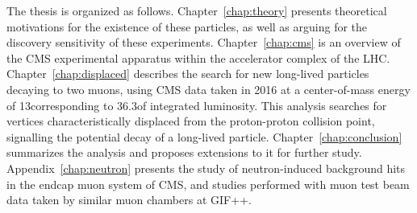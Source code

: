 The thesis is organized as follows.
Chapter~\ref{chap:theory} presents theoretical motivations for the existence of these particles, as well as arguing for the discovery sensitivity of these experiments.
Chapter~\ref{chap:cms} is an overview of the CMS experimental apparatus within the accelerator complex of the LHC.
Chapter~\ref{chap:displaced} describes the search for new long-lived particles decaying to two muons, using CMS data taken in 2016 at a center-of-mass energy of 13\TeV corresponding to 36.3\fbinv of integrated luminosity.
This analysis searches for vertices characteristically displaced from the proton-proton collision point, signalling the potential decay of a long-lived particle.
Chapter~\ref{chap:conclusion} summarizes the analysis and proposes extensions to it for further study.
Appendix~\ref{chap:neutron} presents the study of neutron-induced background hits in the endcap muon system of CMS, and studies performed with muon test beam data taken by similar muon chambers at GIF++.
